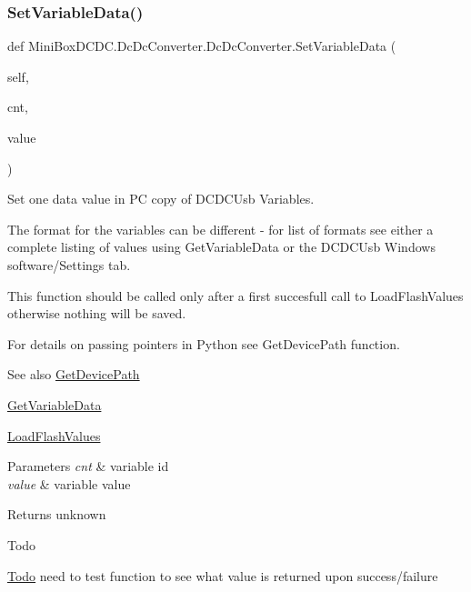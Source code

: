 \subsubsection{\texorpdfstring{Set\+Variable\+Data()}{SetVariableData()}}
{\footnotesize\ttfamily def Mini\+Box\+D\+C\+D\+C.\+Dc\+Dc\+Converter.\+Dc\+Dc\+Converter.\+Set\+Variable\+Data (\begin{DoxyParamCaption}\item[{}]{self,  }\item[{}]{cnt,  }\item[{}]{value }\end{DoxyParamCaption})}



Set one data value in PC copy of D\+C\+D\+C\+Usb Variables. 

The format for the variables can be different -\/ for list of formats see either a complete listing of values using Get\+Variable\+Data or the D\+C\+D\+C\+Usb Windows software/\+Settings tab.

This function should be called only after a first succesfull call to Load\+Flash\+Values otherwise nothing will be saved.

For details on passing pointers in Python see Get\+Device\+Path function.

\begin{DoxySeeAlso}{See also}
\hyperlink{class_mini_box_d_c_d_c_1_1_dc_dc_converter_1_1_dc_dc_converter_a3aef4563d83abf54edc0fa5f5eaa4f62}{Get\+Device\+Path} 

\hyperlink{class_mini_box_d_c_d_c_1_1_dc_dc_converter_1_1_dc_dc_converter_acbdbf705f32cdf20fc3da544241de325}{Get\+Variable\+Data} 

\hyperlink{class_mini_box_d_c_d_c_1_1_dc_dc_converter_1_1_dc_dc_converter_af857153e7845961b8f6a3c2f9456fc42}{Load\+Flash\+Values}
\end{DoxySeeAlso}

\begin{DoxyParams}{Parameters}
{\em cnt} & variable id \\
\hline
{\em value} & variable value\\
\hline
\end{DoxyParams}
\begin{DoxyReturn}{Returns}
unknown
\end{DoxyReturn}
\begin{DoxyRefDesc}{Todo}
\item[\hyperlink{todo__todo000001}{Todo}]need to test function to see what value is returned upon success/failure \end{DoxyRefDesc}
\mbox{\label{class_mini_box_d_c_d_c_1_1_dc_dc_converter_1_1_dc_dc_converter_a7a8cdc0b6dd49950e9ebea4e51f72a6d}} 
